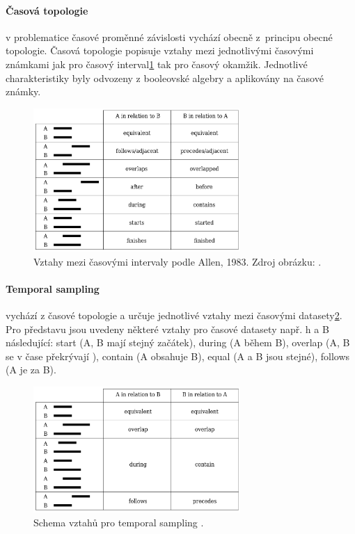 \documentclass[a4paper,12pt,oneside]{report}
\begin{document}
\paragraph*{Časová topologie} v problematice časové proměnné
závislosti vychází obecně z~principu obecné topologie. Časová
topologie popisuje vztahy mezi jednotlivými časovými známkami jak pro
časový interval\ref{fig:topology} tak pro časový okamžik. Jednotlivé charakteristiky
byly odvozeny z booleovské algebry a aplikovány na časové známky.
\begin{figure}[h!]
    \centering
    \includegraphics[width=0.7\textwidth]{./img/temporal/topology.png}
    \caption[Temporal sampling]{ Vztahy mezi časovými intervaly podle Allen, 1983. Zdroj obrázku: \cite{soren}. \centering  }
        \label{fig:topology}
 \end{figure}   

\paragraph*{Temporal sampling} vychází z časové topologie a určuje
jednotlivé vztahy mezi časovými datasety\ref{fig:sampling}. Pro představu jsou uvedeny
některé vztahy pro časové datasety např. h a B následující: start
(A, B mají stejný začátek), during (A během B), overlap (A, B se v
čase překrývají ), contain (A obsahuje B), equal (A a B jsou stejné),
follows (A je za B).



\begin{figure}[h!]
    \centering
    \includegraphics[width=0.7\textwidth]{./img/temporal/sampling.png}
    \caption[Temporal sampling]{Schema vztahů pro temporal sampling \cite{soren}.   \centering  }
        \label{fig:sampling}
 \end{figure}   
\end{document}

